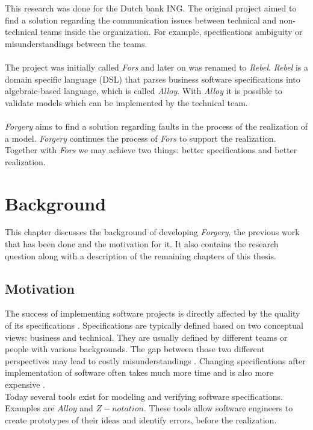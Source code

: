 \documentclass[oneside]{book}
\begin{document}
This research was done for the Dutch bank ING. The original project aimed to find a solution regarding the communication issues between technical and non-technical teams inside the organization. For example, specifications ambiguity or misunderstandings between the teams.
\\\\
The project was initially called \textit{Fors} and later on was renamed to \textit{Rebel}. \textit{Rebel} is a domain specific language (DSL) that parses business software specifications into algebraic-based language, which is called \textit{Alloy}. With \textit{Alloy} it is possible to validate models which can be implemented by the technical team.
\\\\
\textit{Forgery} aims to find a solution regarding faults in the process of the realization of a model. \textit{Forgery} continues the process of \textit{Fors} to support the realization. Together with \textit{Fors} we may achieve two things: better specifications and better realization.

\newpage

\chapter{Background}
This chapter discusses the background of developing \textit{Forgery}, the previous work that has been done and the motivation for it. It also contains the research question along with a description of the remaining chapters of this thesis.

\section{Motivation}

The success of implementing software projects is directly affected by the quality of its specifications \cite[p.~12]{requirements}. Specifications are typically defined based on two conceptual views: business and technical. They are usually defined by different teams or people with various backgrounds. The gap between those two different perspectives may lead to costly misunderstandings \cite[p.~1]{fors}. Changing specifications after implementation of software often takes much more time and is also more expensive \cite{defectstopten}.\\

Today several tools exist for modeling and verifying software specifications. Examples are $Alloy$ and $Z-notation$. These tools allow software engineers to create prototypes of their ideas and identify errors, before the realization. \\
\end{document}
